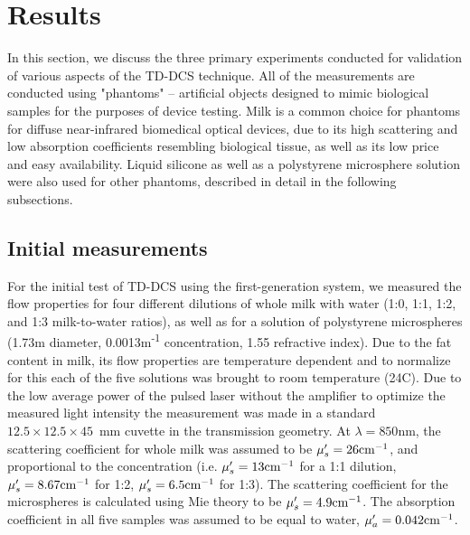 \section{Results}
In this section, we discuss the three primary experiments conducted for validation of various aspects of the TD-DCS technique. All of the measurements are conducted using "phantoms" -- artificial objects designed to mimic biological samples for the purposes of device testing. Milk is a common choice for phantoms for diffuse near-infrared biomedical optical devices, due to its high scattering and low absorption coefficients resembling biological tissue, as well as its low price and easy availability. Liquid silicone as well as a polystyrene microsphere solution were also used for other phantoms, described in detail in the following subsections.  

\subsection{Initial measurements}

For the initial test of TD-DCS using the first-generation system, we measured the flow properties for four different dilutions of whole milk with water (1:0, 1:1, 1:2, and 1:3 milk-to-water ratios), as well as for a solution of polystyrene microspheres (1.73\textmu m diameter, 0.0013\textmu m\textsuperscript{-1} concentration, 1.55 refractive index). Due to the fat content in milk, its flow properties are temperature dependent and to normalize for this each of the five solutions was brought to room temperature (24\textdegree C). Due to the low average power of the pulsed laser without the amplifier %
to optimize the measured light intensity the measurement was made in a standard $12.5\times 12.5\times 45$~mm cuvette in the transmission geometry. %
At $\lambda=850$nm, the scattering coefficient for whole milk was assumed to be $\mu_s'=26 \textnormal{cm}^{-1}$, and proportional to the concentration (i.e. $\mu_s'=13 \textnormal{cm}^{-1}$ for a 1:1 dilution, $\mu_s'=8.67 \textnormal{cm}^{-1}$ for 1:2, $\mu_s'=6.5 \textnormal{cm}^{-1}$ for 1:3). The scattering coefficient for the microspheres is calculated using Mie theory \cite{MieCalc} to be $\mu_s'=4.9 \textnormal{cm}^{-1}$. The absorption coefficient in all five samples was assumed to be equal to water, $\mu_a'=0.042 \textnormal{cm}^{-1}$.


